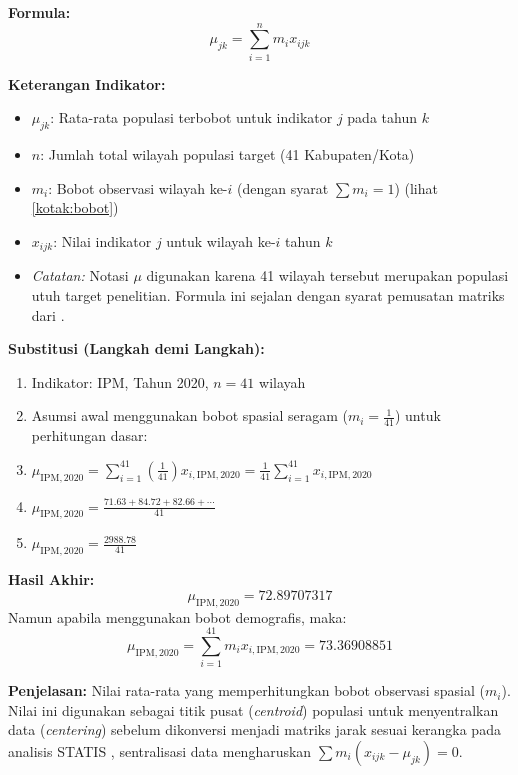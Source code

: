 \documentclass[11pt,a4paper]{article}
\begin{document}
\begin{tcolorbox}[formula_box, title={Rata-Rata Populasi Terbobot (Weighted Mean)}] \label{kotak:mean}
\textbf{Formula:}
\[ \mu_{jk} = \sum_{i=1}^{n} m_i x_{ijk} \]

\textbf{Keterangan Indikator:}
\begin{itemize}
  \item $\mu_{jk}$: Rata-rata populasi terbobot untuk indikator $j$ pada tahun $k$
  \item $n$: Jumlah total wilayah populasi target (41 Kabupaten/Kota)
  \item $m_i$: Bobot observasi wilayah ke-$i$ (dengan syarat $\sum m_i = 1$) (lihat \ref{kotak:bobot})
  \item $x_{ijk}$: Nilai indikator $j$ untuk wilayah ke-$i$ tahun $k$
  \item \textit{Catatan:} Notasi $\mu$ digunakan karena 41 wilayah tersebut merupakan populasi utuh target penelitian. Formula ini sejalan dengan syarat pemusatan matriks dari \citet{lavit94}.
\end{itemize}

\textbf{Substitusi (Langkah demi Langkah):}
\begin{enumerate}
  \item Indikator: IPM, Tahun 2020, $n = 41$ wilayah
  \item Asumsi awal menggunakan bobot spasial seragam ($m_i = \frac{1}{41}$) untuk perhitungan dasar:
  \item $\mu_{\text{IPM},2020} = \sum_{i=1}^{41} \left(\frac{1}{41}\right) x_{i,\text{IPM},2020} = \frac{1}{41} \sum_{i=1}^{41} x_{i,\text{IPM},2020}$
  \item $\mu_{\text{IPM},2020} = \frac{71.63 + 84.72 + 82.66 + \cdots}{41}$
  \item $\mu_{\text{IPM},2020} = \frac{2988.78}{41}$
\end{enumerate}

\textbf{Hasil Akhir:}
\[ \mu_{\text{IPM},2020} = 72.89707317 \]
Namun apabila menggunakan bobot demografis, maka:
\[ \mu_{\text{IPM},2020} = \sum_{i=1}^{41} m_i x_{i,\text{IPM},2020} = 73.36908851 \]

\textbf{Penjelasan:} Nilai rata-rata yang memperhitungkan bobot observasi spasial ($m_i$). Nilai ini digunakan sebagai titik pusat (\textit{centroid}) populasi untuk menyentralkan data (\textit{centering}) sebelum dikonversi menjadi matriks jarak sesuai kerangka pada analisis STATIS \citet{lavit94}, sentralisasi data mengharuskan $\sum m_i (x_{ijk} - \mu_{jk}) = 0$.
\end{tcolorbox}
\end{document}
